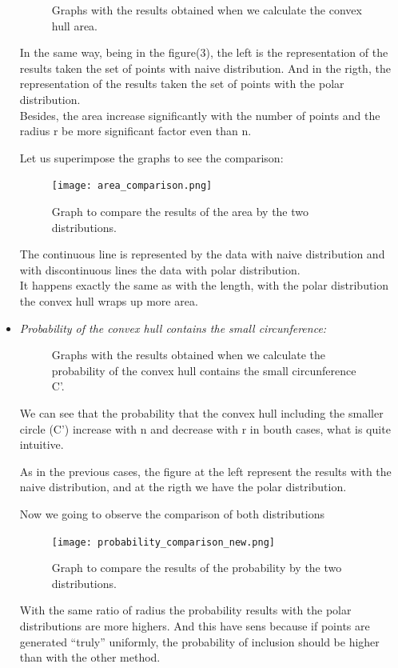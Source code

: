 \documentclass[12pt,a4paper]{article}
\begin{document}
\begin{itemize}
\begin{figure}[H]
 \centering
 \caption{Graphs with the results obtained when we calculate the convex hull area.}
 \label{f:results_area}
\end{figure}
In the same way, being in the figure(3), the left is the representation of the results taken the set of points with naive distribution. And in the rigth, the representation of the results taken the set of points with the polar distribution. \\ 
 
Besides, the area increase significantly with the number of points and the radius r be more significant factor even than n. 

Let us superimpose the graphs to see the comparison:
\begin{figure}[hbtp]
\centering
\texttt{[image: area\_comparison.png]}
\caption{Graph to compare the results of the area by the two distributions.}
\end{figure}

The continuous line is represented by the data with naive distribution and with discontinuous lines the data with polar distribution.\\
It happens exactly the same as with the length, with the polar distribution the convex hull wraps up more area.


\item \emph{Probability of the convex hull contains the small circunference:}
\begin{figure}[H]
 \centering
 \caption{Graphs with the results obtained when we calculate the probability of the convex hull contains the small circunference C'.}
 \label{f:results_prob}
\end{figure}

We can see that the probability that the convex hull including the smaller circle (C') increase with n and decrease with r in bouth cases, what is quite intuitive.

As in the previous cases, the figure at the left represent the results with the naive distribution, and at the rigth we have the polar distribution. 

Now we going to observe the comparison of both distributions

\begin{figure}[hbtp]
\centering
\texttt{[image: probability\_comparison\_new.png]}
\caption{Graph to compare the results of the probability by the two distributions.}
\end{figure}

With the same ratio of radius the probability results with the polar distributions are more highers. And this have sens because if points are generated “truly” uniformly, the probability of inclusion should be higher than with the other method. 

\end{itemize}
\end{document}
